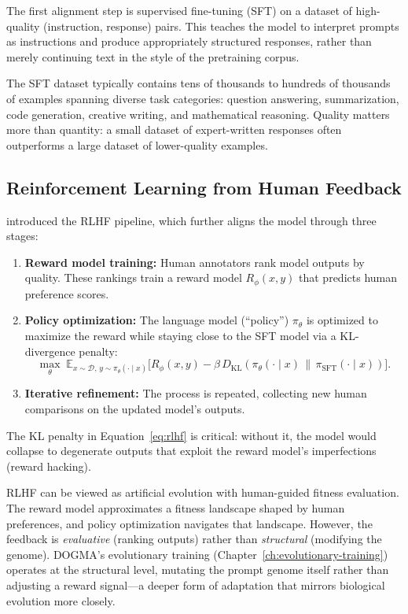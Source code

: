 The first alignment step is supervised fine-tuning (SFT) on a dataset of high-quality (instruction, response) pairs. This teaches the model to interpret prompts as instructions and produce appropriately structured responses, rather than merely continuing text in the style of the pretraining corpus.

The SFT dataset typically contains tens of thousands to hundreds of thousands of examples spanning diverse task categories: question answering, summarization, code generation, creative writing, and mathematical reasoning. Quality matters more than quantity: a small dataset of expert-written responses often outperforms a large dataset of lower-quality examples.

\subsection{Reinforcement Learning from Human Feedback}

\citet{ouyang2022} introduced the RLHF pipeline, which further aligns the model through three stages:

\begin{enumerate}[leftmargin=1.8em]
  \item \textbf{Reward model training:} Human annotators rank model outputs by quality. These rankings train a reward model $R_\phi(x, y)$ that predicts human preference scores.
  \item \textbf{Policy optimization:} The language model (``policy'') $\pi_\theta$ is optimized to maximize the reward while staying close to the SFT model via a KL-divergence penalty:
  \begin{equation}
    \max_\theta \; \mathbb{E}_{x \sim \mathcal{D},\, y \sim \pi_\theta(\cdot \mid x)} \bigl[ R_\phi(x, y) - \beta \, D_{\text{KL}}\!\left(\pi_\theta(\cdot \mid x) \,\|\, \pi_{\text{SFT}}(\cdot \mid x)\right) \bigr].
    \label{eq:rlhf}
  \end{equation}
  \item \textbf{Iterative refinement:} The process is repeated, collecting new human comparisons on the updated model's outputs.
\end{enumerate}

The KL penalty in Equation~\ref{eq:rlhf} is critical: without it, the model would collapse to degenerate outputs that exploit the reward model's imperfections (reward hacking).

\begin{bioinsight}
RLHF can be viewed as artificial evolution with human-guided fitness evaluation. The reward model approximates a fitness landscape shaped by human preferences, and policy optimization navigates that landscape. However, the feedback is \emph{evaluative} (ranking outputs) rather than \emph{structural} (modifying the genome). DOGMA's evolutionary training (Chapter~\ref{ch:evolutionary-training}) operates at the structural level, mutating the prompt genome itself rather than adjusting a reward signal---a deeper form of adaptation that mirrors biological evolution more closely.
\end{bioinsight}

